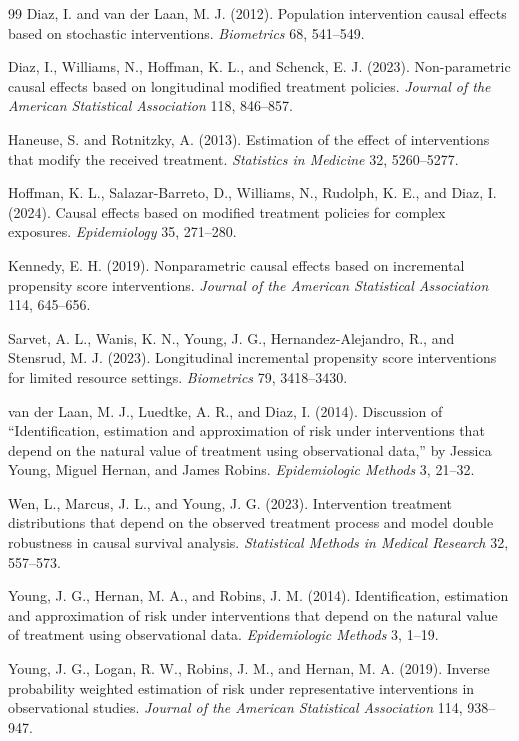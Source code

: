 \documentclass[11pt]{article}
\theoremstyle{definition}
\theoremstyle{plain}
\theoremstyle{remark}
\begin{document}
\begin{thebibliography}{99}
Diaz, I. and van der Laan, M. J. (2012). Population intervention causal effects based on stochastic interventions. \textit{Biometrics} 68, 541--549.

Diaz, I., Williams, N., Hoffman, K. L., and Schenck, E. J. (2023). Non-parametric causal effects based on longitudinal modified treatment policies. \textit{Journal of the American Statistical Association} 118, 846--857.

Haneuse, S. and Rotnitzky, A. (2013). Estimation of the effect of interventions that modify the received treatment. \textit{Statistics in Medicine} 32, 5260--5277.

Hoffman, K. L., Salazar-Barreto, D., Williams, N., Rudolph, K. E., and Diaz, I. (2024). Causal effects based on modified treatment policies for complex exposures. \textit{Epidemiology} 35, 271--280.

Kennedy, E. H. (2019). Nonparametric causal effects based on incremental propensity score interventions. \textit{Journal of the American Statistical Association} 114, 645--656.

Sarvet, A. L., Wanis, K. N., Young, J. G., Hernandez-Alejandro, R., and Stensrud, M. J. (2023). Longitudinal incremental propensity score interventions for limited resource settings. \textit{Biometrics} 79, 3418--3430.

van der Laan, M. J., Luedtke, A. R., and Diaz, I. (2014). Discussion of ``Identification, estimation and approximation of risk under interventions that depend on the natural value of treatment using observational data,'' by Jessica Young, Miguel Hernan, and James Robins. \textit{Epidemiologic Methods} 3, 21--32.

Wen, L., Marcus, J. L., and Young, J. G. (2023). Intervention treatment distributions that depend on the observed treatment process and model double robustness in causal survival analysis. \textit{Statistical Methods in Medical Research} 32, 557--573.

Young, J. G., Hernan, M. A., and Robins, J. M. (2014). Identification, estimation and approximation of risk under interventions that depend on the natural value of treatment using observational data. \textit{Epidemiologic Methods} 3, 1--19.

Young, J. G., Logan, R. W., Robins, J. M., and Hernan, M. A. (2019). Inverse probability weighted estimation of risk under representative interventions in observational studies. \textit{Journal of the American Statistical Association} 114, 938--947.
\end{thebibliography}
\end{document}
